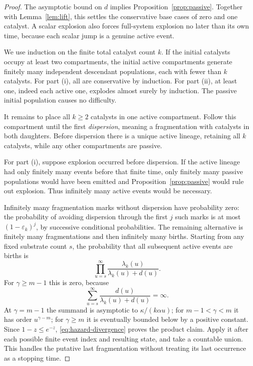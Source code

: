 \documentclass[11pt,a4paper]{article}
\theoremstyle{remark}\newtheorem{remark}[theorem]{Remark}
\begin{document}
\begin{proof}
The asymptotic bound on $d$ implies Proposition~\ref{prop:passive}. Together with Lemma~\ref{lem:lift}, this settles the conservative base cases of zero and one catalyst. A scalar explosion also forces full-system explosion no later than its own time, because each scalar jump is a genuine active event.

We use induction on the finite total catalyst count $k$. If the initial catalysts occupy at least two compartments, the initial active compartments generate finitely many independent descendant populations, each with fewer than $k$ catalysts. For part (i), all are conservative by induction. For part (ii), at least one, indeed each active one, explodes almost surely by induction. The passive initial population causes no difficulty.

It remains to place all $k\ge2$ catalysts in one active compartment. Follow this compartment until the first \emph{dispersion}, meaning a fragmentation with catalysts in both daughters. Before dispersion there is a unique active lineage, retaining all $k$ catalysts, while any other compartments are passive.

For part (i), suppose explosion occurred before dispersion. If the active lineage had only finitely many events before that finite time, only finitely many passive populations would have been emitted and Proposition~\ref{prop:passive} would rule out explosion. Thus infinitely many active events would be necessary.

Infinitely many fragmentation marks without dispersion have probability zero: the probability of avoiding dispersion through the first $j$ such marks is at most $(1-\varepsilon_k)^j$, by successive conditional probabilities. The remaining alternative is finitely many fragmentations and then infinitely many births. Starting from any fixed substrate count $s$, the probability that all subsequent active events are births is
\begin{equation}\label{eq:birth-product}
\prod_{u=s}^{\infty}\frac{\lambda_k(u)}{\lambda_k(u)+d(u)}.
\end{equation}
For $\gamma\ge m-1$ this is zero, because
\begin{equation}\label{eq:hazard-divergence}
\sum_{u=s}^{\infty}\frac{d(u)}{\lambda_k(u)+d(u)}=\infty.
\end{equation}
At $\gamma=m-1$ the summand is asymptotic to $\kappa/(k\alpha u)$; for $m-1<\gamma<m$ it has order $u^{\gamma-m}$; for $\gamma\ge m$ it is eventually bounded below by a positive constant. Since $1-z\le e^{-z}$, \eqref{eq:hazard-divergence} proves the product claim. Apply it after each possible finite event index and resulting state, and take a countable union. This handles the putative last fragmentation without treating its last occurrence as a stopping time.


\end{proof}
\end{document}
